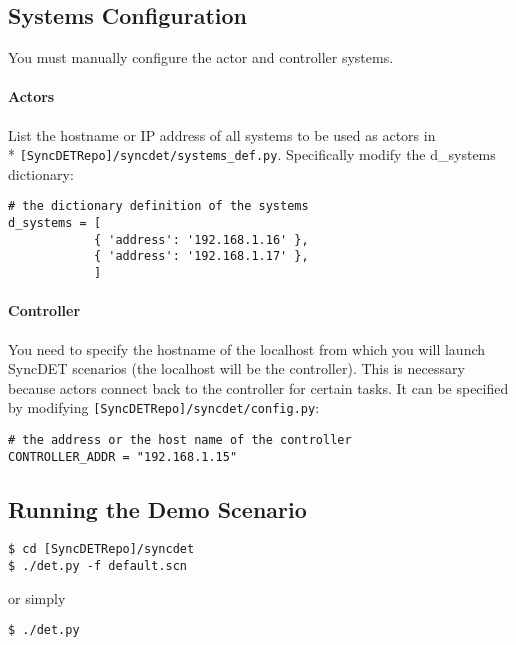 \subsection{Systems Configuration}
You must manually configure the actor and controller systems. 

\paragraph{Actors} 
List the hostname or IP address of all systems to be used as actors in \\*
{\tt [SyncDETRepo]/syncdet/systems\_def.py}. Specifically modify the d\_systems
dictionary:
\begin{verbatim}
# the dictionary definition of the systems
d_systems = [
            { 'address': '192.168.1.16' },
            { 'address': '192.168.1.17' },
            ]
\end{verbatim}

\paragraph{Controller} 
You need to specify the hostname of the localhost from which you will launch
SyncDET scenarios (the localhost will be the controller). This is necessary
because actors connect back to the controller for certain tasks. It can be
specified by modifying {\tt [SyncDETRepo]/syncdet/config.py}:
\begin{verbatim}
# the address or the host name of the controller
CONTROLLER_ADDR = "192.168.1.15"
\end{verbatim}

\subsection{Running the Demo Scenario}
\begin{verbatim}
$ cd [SyncDETRepo]/syncdet
$ ./det.py -f default.scn
\end{verbatim}

or simply

\begin{verbatim}
$ ./det.py
\end{verbatim}
